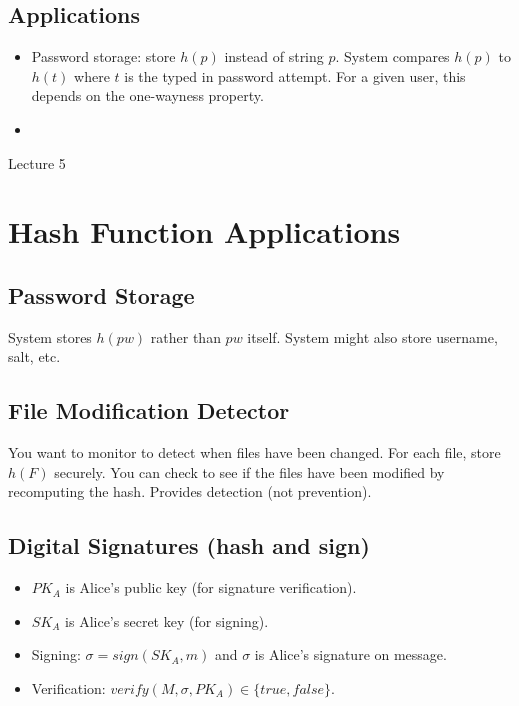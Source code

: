 \documentclass[psamsfonts]{amsart}
\begin{document}
\subsection{Applications}

\begin{itemize}
\item Password storage: store $h(p)$ instead of string $p$. System compares $h(p)$ to $h(t)$ where $t$ is the typed in password attempt. For a given user, this depends on the one-wayness property. 
\item 

\end{itemize}


\newpage
\Large{Lecture 5}


\maketitle

\section{Hash Function Applications}

\subsection{Password Storage}

System stores $h(pw)$ rather than $pw$ itself. System might also store username, salt, etc.

\subsection{File Modification Detector}

You want to monitor to detect when files have been changed. For each file, store $h(F)$ securely. You can check to see if the files have been modified by recomputing the hash. Provides detection (not prevention).

\subsection{Digital Signatures (hash and sign)}

\begin{itemize}
  \item $PK_A$ is Alice's public key (for signature verification). 
  \item $SK_A$ is Alice's secret key (for signing). 
  \item Signing: $\sigma = sign(SK_A, m)$ and $\sigma$ is Alice's signature on message. 
  \item Verification: $verify(M, \sigma, PK_A) \in \{true, false\}$. 
\end{itemize}
\end{document}
